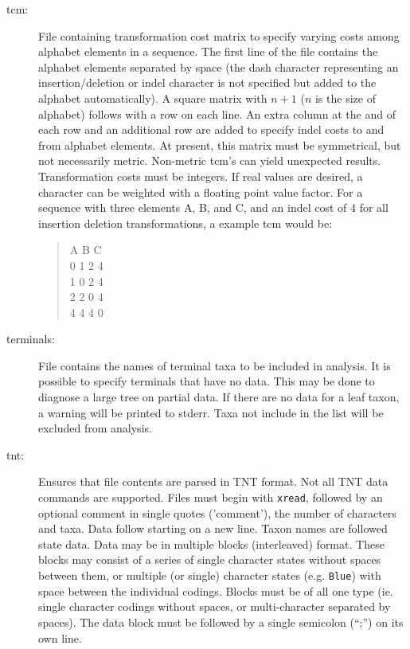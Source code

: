 \begin{description}
		\item [tcm:] File containing transformation cost matrix to specify varying costs among alphabet elements 
		in a sequence. The first line of the file contains the alphabet elements separated by space (the dash 
		character representing an insertion/deletion or indel character is not specified but added to the alphabet 
		automatically). A square matrix with $n + 1$ ($n$ is the size of alphabet) follows with a row on each line. 
		An extra column at the and of each row and an additional row are added to specify indel costs to and from 
		alphabet elements. At present, this matrix must be symmetrical, but not necessarily metric. Non-metric 
		tcm's can yield unexpected results. Transformation costs must be integers. If real values are desired, a 
		character can be weighted with a floating point value factor. For a sequence with three elements A, B, and 
		C, and an indel cost of 4 for all insertion deletion transformations, a example tcm would be:
		
			\begin{quote}
				A B C\\
				0 1 2 4\\
				1 0 2 4\\
				2 2 0 4\\
			  4 4 4 0\\
		  	 \end{quote}
  		 
		\item [terminals:] File contains the names of terminal taxa to be included in analysis. It is possible to specify 
		terminals that have no data. This may be done to diagnose a large tree on partial data. If there are no data 
		for a leaf taxon, a warning will be printed to stderr. Taxa not include in the list will be excluded from analysis. 
	  
		\item [tnt:] Ensures that file contents are parsed in TNT \citep{Goloboffetal2008} format. Not all TNT data 
		commands are supported. Files must begin with \texttt{xread}, followed by an optional comment in single 
		quotes ('comment'), the number of characters and taxa. Data follow starting on a new line. Taxon names 
		are followed state data. Data may be in multiple blocks (interleaved) format. These 	blocks may consist 
		of a series of single character states without spaces between them, or multiple (or single) character states 
		(e.g. \texttt{Blue}) with space between the individual codings. Blocks must be of all one type (ie. single 
		character codings without spaces, or multi-character separated by spaces). The data block must be followed 
		by a single semicolon (``;'') on its own line.
			

\end{description}
